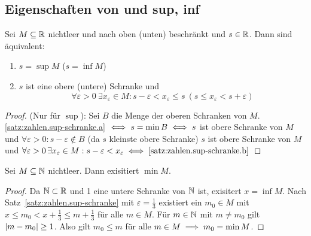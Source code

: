 \documentclass[12pt]{scrreprt}
\begin{document}
\subsection*{Eigenschaften von  und sup, inf}
\begin{satz}\label{satz:zahlen.sup-schranke}
Sei $M \subseteq \mathbb{R}$ nichtleer und nach oben (unten) beschränkt
und $s \in \mathbb{R}$. Dann sind äquivalent:
\begin{enumerate}
\item \label{satz:zahlen.sup-schranke.a} 
$s = \sup M$ ($s = \inf M$)
\item \label{satz:zahlen.sup-schranke.b}
$s$ ist eine obere (untere) Schranke und 
\[\forall \varepsilon > 0\ \exists x_\varepsilon \in M: s - \varepsilon < x_\varepsilon \le s \ ( s \le x_\varepsilon < s+\varepsilon)\]
\end{enumerate}
\end{satz}
\begin{proof}
(Nur für $\sup$):
Sei $B$ die Menge der oberen Schranken von $M$.
\ref{satz:zahlen.sup-schranke.a} $\iff s= \min B \iff s$ ist obere Schranke von $M$ und $\forall \varepsilon > 0 : s - \varepsilon \notin B$
(da $s$ kleinste obere Schranke) \gdw $s$ ist obere Schranke von $M$ und 
$\forall \varepsilon > 0\,\exists x_\varepsilon \in M: s-\varepsilon < x_\varepsilon \iff \ref{satz:zahlen.sup-schranke.b}$
\end{proof}

\begin{satz}\label{satz:zahlen.min-in-nat}
Sei $M \subseteq \mathbb{N}$ nichtleer. Dann exisitiert $\min M$.
\end{satz}
\begin{proof}
Da $\mathbb{N} \subset \mathbb{R}$ und 1 eine untere Schranke von $\mathbb{N}$ ist,
exisitert $x = \inf M$. Nach Satz~\ref{satz:zahlen.sup-schranke} mit $\varepsilon = \frac{1}{3}$ existiert
ein $m_0 \in M$ mit $ x \le m_0 < x + \frac{1}{3} \le m + \frac{1}{3}$ für alle $ m \in M$.
Für $m \in \mathbb{N}$ mit $m \ne m_0$ gilt $\left\lvert m - m_0\right\lvert \ge 1$. Also gilt $m_0 \le m$ für alle $ m\in M \implies m_0 = \min M$.
\end{proof}
\end{document}
